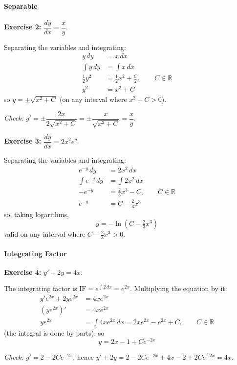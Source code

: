 \documentclass[]{article}
\newcommand{\R}{\mathbb{R}}
\begin{document}
	\paragraph{Separable}\mbox{}

	\textbf{Exercise 2:} $\dfrac{dy}{dx} = \dfrac{x}{y}$.

	Separating the variables and integrating:
	\begin{align*}
		y \, dy &= x \, dx \\
		\int y \, dy &= \int x \, dx \\
		\tfrac{1}{2} y^2 &= \tfrac{1}{2} x^2 + \tfrac{C}{2}, \qquad C \in \R \\
		y^2 &= x^2 + C
	\end{align*}
	so $y = \pm\sqrt{x^2 + C}$ (on any interval where $x^2 + C > 0$).

	\textit{Check:} $y' = \pm\dfrac{2x}{2\sqrt{x^2+C}} = \pm\dfrac{x}{\sqrt{x^2+C}} = \dfrac{x}{y}$. \checkmark

	\textbf{Exercise 3:} $\dfrac{dy}{dx} = 2x^2 e^y$.

	Separating the variables and integrating:
	\begin{align*}
		e^{-y} \, dy &= 2x^2 \, dx \\
		\int e^{-y} \, dy &= \int 2x^2 \, dx \\
		-e^{-y} &= \tfrac{2}{3} x^3 - C, \qquad C \in \R \\
		e^{-y} &= C - \tfrac{2}{3} x^3
	\end{align*}
	so, taking logarithms,
	$$y = -\ln\!\left(C - \tfrac{2}{3}x^3\right)$$
	valid on any interval where $C - \tfrac{2}{3}x^3 > 0$.

	\paragraph{Integrating Factor}\mbox{}

	\textbf{Exercise 4:} $y' + 2y = 4x$.

	The integrating factor is $\mathrm{IF} = e^{\int 2 \, dx} = e^{2x}$. Multiplying the equation by it:
	\begin{align*}
		y' e^{2x} + 2y e^{2x} &= 4x e^{2x} \\
		\left(y e^{2x}\right)' &= 4x e^{2x} \\
		y e^{2x} &= \int 4x e^{2x} \, dx = 2x e^{2x} - e^{2x} + C, \qquad C \in \R
	\end{align*}
	(the integral is done by parts), so
	$$y = 2x - 1 + C e^{-2x}$$

	\textit{Check:} $y' = 2 - 2Ce^{-2x}$, hence $y' + 2y = 2 - 2Ce^{-2x} + 4x - 2 + 2Ce^{-2x} = 4x$. \checkmark
\end{document}
